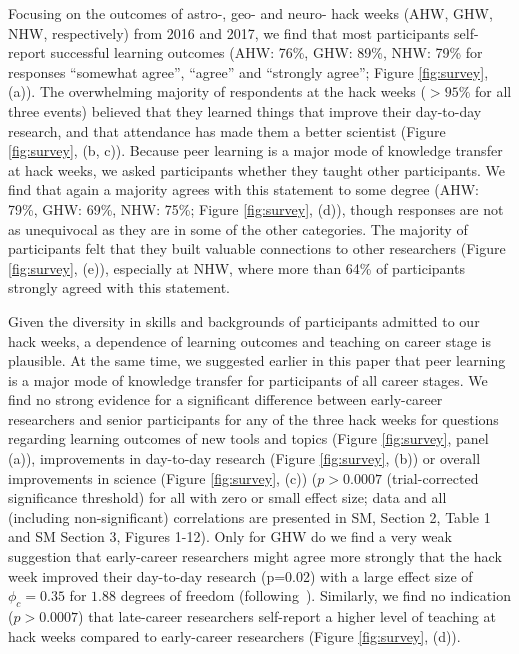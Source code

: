 Focusing on the outcomes of astro-, geo- and neuro- hack weeks (AHW, GHW, NHW, respectively) from 2016 and 2017, we find that most participants self-report successful learning outcomes (AHW: 76\%, GHW: 89\%, NHW: 79\% for responses ``somewhat agree'', ``agree'' and ``strongly agree''; Figure \ref{fig:survey}, (a)).
The overwhelming majority of respondents at the hack weeks ($>95\%$ for all three events) believed that they learned things that improve their day-to-day research, and that attendance has made them a better scientist  (Figure \ref{fig:survey}, (b, c)).
Because peer learning is a major mode of knowledge transfer at hack weeks, we asked participants whether they taught other participants.
We find that again a majority agrees with this statement to some degree (AHW: 79\%, GHW: 69\%, NHW: 75\%; Figure \ref{fig:survey}, (d)), though responses are not as unequivocal as they are in some of the other categories.
The majority of participants felt that they built valuable connections to other researchers (Figure \ref{fig:survey}, (e)), especially at NHW, where more than 64\% of participants strongly agreed with this statement. 

Given the diversity in skills and backgrounds of participants admitted to our hack weeks, a dependence of learning outcomes and teaching on career stage is plausible. At the same time, we suggested earlier in this paper that peer learning is a major mode of knowledge transfer for participants of all career stages. We find no strong evidence for a significant difference between early-career researchers and senior participants for any of the three hack weeks for questions regarding learning outcomes of new tools and topics (Figure \ref{fig:survey}, panel (a)), improvements in day-to-day research (Figure \ref{fig:survey}, (b)) or overall improvements in science (Figure \ref{fig:survey}, (c)) ($p > 0.0007$ (trial-corrected significance threshold) for all with zero or small effect size; data and all (including non-significant) correlations are presented in SM, Section 2, Table 1 and SM Section 3, Figures 1-12). Only for GHW do we find a very weak suggestion that early-career researchers might agree more strongly that the hack week improved their day-to-day research (p=0.02) with a large effect size of $\phi_c = 0.35$ for $1.88$ degrees of freedom (following~\citep{cohen1988}). 
Similarly, we find no indication ($p > 0.0007$) that late-career researchers self-report a higher level of teaching at hack weeks compared to early-career researchers (Figure \ref{fig:survey}, (d)).

